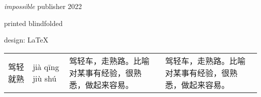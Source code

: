 \documentclass{book}        %
\date{}
\begin{document}
\begin{titlepage}\thispagestyle{empty} \vspace*{3em}{\centering\Huge 软件开发过程改进 \par}\clearpage
\newpage \thispagestyle{empty} \mbox{} \cleardoublepage
\thispagestyle{empty} \cleardoublepage

\thispagestyle{empty} \vspace*{\fill} \parbox{.8\textwidth}{\raggedright \scriptsize
\textit{impossible} publisher 2022

printed blindfolded

design: \LaTeX
}
\end{titlepage}
\clearpage \thispagestyle{empty}\cleardoublepage
\newpage %


\tableofcontents %




\begin{tabular}{|l|l|p{5cm}|l}
\mbox{驾轻就熟} & jià qīng jiù shú & 驾轻车，走熟路。比喻对某事有经验，很熟悉，做起来容易。 & 驾轻车，走熟路。比喻对某事有经验，很熟悉，做起来容易。 \\
\end{tabular}



\end{document}
